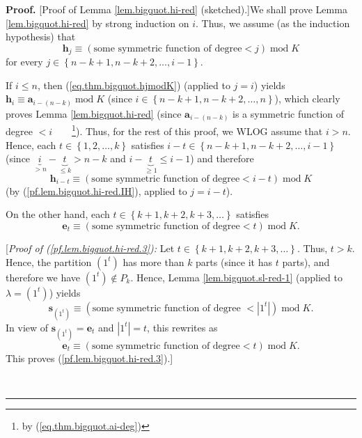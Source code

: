 \documentclass[numbers=enddot,12pt,final,onecolumn,notitlepage]{scrartcl}%
\theoremstyle{definition}
\newenvironment{proof}[1][Proof]{\noindent\textbf{#1.} }{\ \rule{0.5em}{0.5em}}
\begin{document}
\begin{proof}
[Proof of Lemma \ref{lem.bigquot.hi-red} (sketched).]We shall prove Lemma
\ref{lem.bigquot.hi-red} by strong induction on $i$. Thus, we assume (as the
induction hypothesis) that%
\begin{equation}
\mathbf{h}_{j}\equiv\left(  \text{some symmetric function of degree
}<j\right)  \operatorname{mod}K \label{pf.lem.bigquot.hi-red.IH}%
\end{equation}
for every $j\in\left\{  n-k+1,n-k+2,\ldots,i-1\right\}  $.

If $i\leq n$, then (\ref{eq.thm.bigquot.hjmodK}) (applied to $j=i$) yields
$\mathbf{h}_{i}\equiv\mathbf{a}_{i-\left(  n-k\right)  }\operatorname{mod}K$
(since $i\in\left\{  n-k+1,n-k+2,\ldots,n\right\}  $), which clearly proves
Lemma \ref{lem.bigquot.hi-red} (since $\mathbf{a}_{i-\left(  n-k\right)  }$ is
a symmetric function of degree $<i$\ \ \ \ \footnote{by
(\ref{eq.thm.bigquot.ai-deg})}). Thus, for the rest of this proof, we WLOG
assume that $i>n$. Hence, each $t\in\left\{  1,2,\ldots,k\right\}  $ satisfies
\newline$i-t\in\left\{  n-k+1,n-k+2,\ldots,i-1\right\}  $ (since
$\underbrace{i}_{>n}-\underbrace{t}_{\leq k}>n-k$ and $i-\underbrace{t}%
_{\geq1}\leq i-1$) and therefore%
\begin{equation}
\mathbf{h}_{i-t}\equiv\left(  \text{some symmetric function of degree
}<i-t\right)  \operatorname{mod}K \label{pf.lem.bigquot.hi-red.2}%
\end{equation}
(by (\ref{pf.lem.bigquot.hi-red.IH}), applied to $j=i-t$).

On the other hand, each $t\in\left\{  k+1,k+2,k+3,\ldots\right\}  $ satisfies%
\begin{equation}
\mathbf{e}_{t}\equiv\left(  \text{some symmetric function of degree
}<t\right)  \operatorname{mod}K. \label{pf.lem.bigquot.hi-red.3}%
\end{equation}


[\textit{Proof of (\ref{pf.lem.bigquot.hi-red.3}):} Let $t\in\left\{
k+1,k+2,k+3,\ldots\right\}  $. Thus, $t>k$. Hence, the partition $\left(
1^{t}\right)  $ has more than $k$ parts (since it has $t$ parts), and
therefore we have $\left(  1^{t}\right)  \notin P_{k}$. Hence, Lemma
\ref{lem.bigquot.sl-red-1} (applied to $\lambda=\left(  1^{t}\right)  $)
yields%
\[
\mathbf{s}_{\left(  1^{t}\right)  }\equiv\left(  \text{some symmetric function
of degree }<\left\vert 1^{t}\right\vert \right)  \operatorname{mod}K.
\]
In view of $\mathbf{s}_{\left(  1^{t}\right)  }=\mathbf{e}_{t}$ and
$\left\vert 1^{t}\right\vert =t$, this rewrites as
\[
\mathbf{e}_{t}\equiv\left(  \text{some symmetric function of degree
}<t\right)  \operatorname{mod}K.
\]
This proves (\ref{pf.lem.bigquot.hi-red.3}).]


\end{proof}
\end{document}
